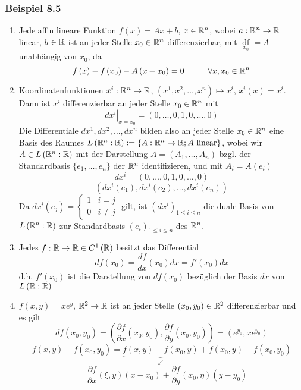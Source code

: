 \subsubsection*{Beispiel 8.5}
\begin{enumerate}[\indent a)]
\item Jede affin lineare Funktion $f(x)=Ax+b$, $x\in\mathbb{R}^n$, wobei $a:\mathbb{R}^n\to\mathbb{R}$ linear, $b$ $\in\mathbb{R}$ ist an jeder Stelle $x_0\in\mathbb{R}^n$ differenzierbar, mit $\mathop {df}\limits_{{x_0}} =A$ unabhängig von $x_0$, da
\[f\left( x \right) - f\left( {{x_0}} \right) - A\left( {x - {x_0}} \right) = 0\hspace{10mm}\forall x,{x_0} \in\R^n\]
\item Koordinatenfunktionen $x^i:\mathbb{R}^n\to\mathbb{R}$, $\left( x^1,x^2,\dots,x^n\right)\mapsto x^i$, $x^i(x)=x^i$. Dann ist $x^i$ differenzierbar an jeder Stelle $x_0\in\mathbb{R}^n$ mit
\[{\left. {d{x^i}} \right|_{x = {x_0}}} = \left( {0, \ldots ,0,1,0, \ldots ,0} \right)\]
Die Differentiale $dx^1,dx^2,\dots,dx^n$ bilden also an jeder Stelle $x_0\in\mathbb{R}^n$ eine Basis des Raumes $L\left( {\mathbb{R}^n:\mathbb{R}} \right):=\left\{ A:\mathbb{R}^n\to\mathbb{R}; A\text{ linear}\right\}$, wobei wir $A\in L\left( \mathbb{R}^n:\mathbb{R}\right)$ mit der Darstellung $A=\left( A_1,\dots,A_n\right)$ bzgl. der Standardbasis $\{ e_1,\dots,e_n\}$ der $\mathbb{R}^n$ identifizieren, und mit $A_i=A\left( e_i\right)$ \[d{x^i} = \left( {0, \ldots ,0,1,0, \ldots ,0} \right)\]\[\left( {d{x^i}\left( {{e_1}} \right),d{x^i}\left( {{e_2}} \right), \ldots ,d{x^i}\left( {{e_n}} \right)} \right)\]
Da $d{x^i}\left( {{e_j}} \right) = \left\{ {\begin{array}{*{20}{c}}
1&{i = j}\\
0&{i\not  = j}
\end{array}} \right.$ gilt, ist ${\left( {d{x^i}} \right)_{1 \le i \le n}}$ die duale Basis von $L\left( \mathbb{R}^n:\mathbb{R}\right)$ zur Standardbasis ${\left( {e_i} \right)_{1 \le i \le n}}$ des $\mathbb{R}^n$.
\item Jedes $f:\mathbb{R}\to\mathbb{R}\in C^1\left(\mathbb{R}\right)$ besitzt das Differential \[df\left( {{x_0}} \right) = \frac{{df}}{{dx}}\left( {{x_0}} \right)dx = f'\left( {{x_0}} \right)dx\] d.h. $f'\left(x_0\right)$ ist die Darstellung von $df\left(x_0\right)$ bezüglich der Basis $dx$ von $L\left(\mathbb{R}:\mathbb{R}\right)$
\item $f\left(x,y\right)=xe^y$, $\mathbb{R}^2\to\mathbb{R}$ ist an jeder Stelle $\left(x_0,y_0\right)\in\mathbb{R}^2$ differenzierbar und es gilt \[df\left( {{x_0},{y_0}} \right) = \left( {\frac{{\partial f}}{{\partial x}}\left( {{x_0},{y_0}} \right),\frac{{\partial f}}{{\partial y}}\left( {{x_0},{y_0}} \right)} \right) = \left( {{e^{{y_0}}},x{e^{{y_0}}}} \right)\] \[f\left( {x,y} \right) - f\left( {{x_0},{y_0}} \right) = \underbrace {f\left( {x,y} \right) - f\left( {{x_0},y} \right)}_ \swarrow  + f\left( {{x_0},y} \right) - f\left( {{x_0},{y_0}} \right)\] \[ = \frac{{\partial f}}{{\partial x}}\left( {\xi ,y} \right)\left( {x - {x_0}} \right) + \frac{{\partial f}}{{\partial y}}\left( {{x_0},\eta } \right)\left( {y - {y_0}} \right)\]

\end{enumerate}

